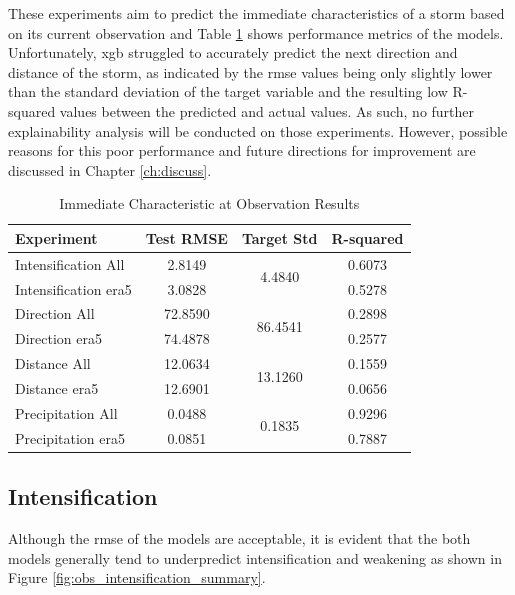 These experiments aim to predict the immediate characteristics of a storm based on its current observation and Table \ref{tab:obs_experiment_results} shows performance metrics of the models. Unfortunately, \acrshort{xgb} struggled to accurately predict the next direction and distance of the storm, as indicated by the \acrshort{rmse} values being only slightly lower than the standard deviation of the target variable and the resulting low R-squared values between the predicted and actual values. As such, no further explainability analysis will be conducted on those experiments. However, possible reasons for this poor performance and future directions for improvement are discussed in Chapter \ref{ch:discuss}.

\begin{table}[h!]
\centering
\caption{Immediate Characteristic at Observation Results}
\label{tab:obs_experiment_results}
\begin{tabular}{lccc}
\hline
\textbf{Experiment} & \textbf{Test RMSE} & \textbf{Target Std} & \textbf{R-squared} \\
\hline
Intensification All     & 2.8149  & \multirow{2}{*}{4.4840}  & 0.6073 \\
Intensification \acrshort{era5}    & 3.0828  & & 0.5278 \\
Direction All     & 72.8590 & \multirow{2}{*}{86.4541} & 0.2898 \\
Direction \acrshort{era5}     & 74.4878 & & 0.2577 \\
Distance All      & 12.0634 & \multirow{2}{*}{13.1260} & 0.1559 \\
Distance \acrshort{era5}     & 12.6901 & & 0.0656 \\
Precipitation All       & 0.0488  & \multirow{2}{*}{0.1835}  & 0.9296 \\
Precipitation \acrshort{era5}      & 0.0851  & & 0.7887 \\
\hline
\end{tabular}
\end{table}

\clearpage
\subsection{Intensification}

Although the \acrshort{rmse} of the models are acceptable, it is evident that the both models generally tend to underpredict intensification and weakening as shown in Figure \ref{fig:obs_intensification_summary}.

